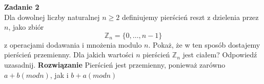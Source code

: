 \documentclass{../note}
\begin{document}
\textbf{Zadanie 2}\\
Dla dowolnej liczby naturalnej $n \ge 2$ definiujemy pierścień reszt z dzielenia przez $n$, jako zbiór
\[
\mathbb{Z}_n = \{0, \ldots, n - 1\}
\]
z operacjami dodawania i mnożenia modulo $n$. Pokaż, że w ten sposób dostajemy pierścień przemienny. Dla jakich wartości $n$ pierścień $\mathbb{Z}_n$ jest ciałem? Odpowiedź uzasadnij.
\textbf{Rozwiązanie}
Pierścień jest przemienny, ponieważ zarówno $a + b (mod n)$, jak i $b + a (mod n)$
\end{document}
